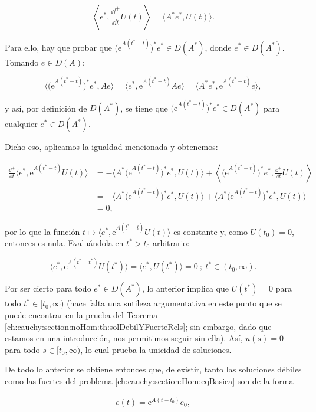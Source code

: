 \[\left \langle e^*, \frac{\dd^+}{\dd t}U(t)\right \rangle = \langle A^*e^*, U(t) \rangle.\]

Para ello, hay que probar que $\big(\mathrm{e}^{A(t^*-t)}\big)^*e^*\in D(A^*)$, donde $e^* \in D(A^*)$. Tomando $e \in D(A)$:

\[\Big\langle \big(\mathrm{e}^{A(t^*-t)}\big)^*e^*, Ae \Big\rangle = \langle e^*, \mathrm{e}^{A(t^* - t)}Ae \rangle = \langle A^*e^*, \mathrm{e}^{A(t^*-t)}e\rangle,\]

y así, por definición de $D(A^*)$, se tiene que $\big(\mathrm{e}^{A(t^*-t)}\big)^*e^*\in D(A^*)$ para cualquier $e^* \in D(A^*)$.

Dicho eso, aplicamos la igualdad mencionada y obtenemos:

\begin{align*}
    \frac{\dd^+}{\dd t}\langle e^*, \mathrm{e}^{A(t^* - t)}U(t) \rangle &= -\Big\langle A^*\big (\mathrm{e}^{A(t^* - t)}\big)^*e^*, U(t) \Big\rangle + \left\langle \big (\mathrm{e}^{A(t^* - t)}\big)^*e^*, \frac{\dd^+}{\dd t}U(t) \right\rangle\\
    &= -\Big\langle A^*\big (\mathrm{e}^{A(t^* - t)}\big)^*e^*, U(t) \Big\rangle + \Big\langle A^*\big (\mathrm{e}^{A(t^* - t)}\big)^*e^*, U(t) \Big\rangle\\
    &= 0,
\end{align*}

por lo que la función $t \mapsto \langle e^*, \mathrm{e}^{A(t^* - t)}U(t) \rangle$ es constante y, como $U(t_0) = 0$, entonces es nula. Evaluándola en $t^* > t_0$ arbitrario:

\[\langle e^*, \mathrm{e}^{A(t^* - t^*)}U(t^*)\rangle = \langle e^*, U(t^*) \rangle = 0 \ ; \ t^* \in (t_0, \infty).\]

Por ser cierto para todo $e^* \in D(A^*)$, lo anterior implica que $U(t^*) = 0$ para todo $t^* \in [t_0, \infty)$ (hace falta una sutileza argumentativa en este punto que se puede encontrar en la prueba del Teorema \ref{ch:cauchy:section:noHom:th:solDebilYFuerteRels}; sin embargo, dado que estamos en una introducción, nos permitimos seguir sin ella). Así, $u(s) = 0$ para todo $s \in [t_0, \infty)$, lo cual prueba la unicidad de soluciones.

De todo lo anterior se obtiene entonces que, de existir, tanto las soluciones débiles como las fuertes del problema \eqref{ch:cauchy:section:Hom:eqBasica} son de la forma 

\begin{align}
    \label{Hom:FormaSoluciones}
    e(t) = \mathrm{e}^{A(t-t_0)}e_0,
\end{align}

